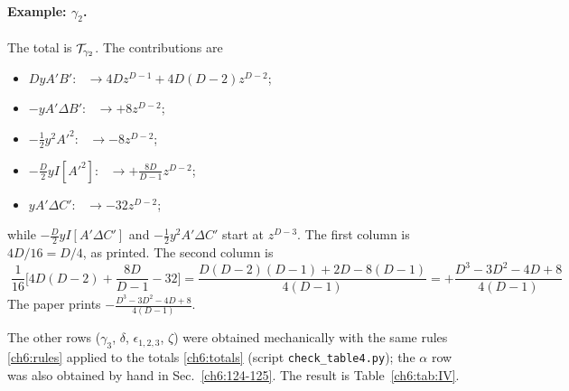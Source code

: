 \paragraph{Example: $\gamma_2$.} The total is $\mathcal{T}_{\gamma_2}$. The contributions are
\begin{itemize}[leftmargin=14pt]
\item $DyA'B'$: \ $\to4Dz^{D-1}+4D(D-2)z^{D-2}$;
\item $-yA'\Delta B'$: \ $\to+8z^{D-2}$;
\item $-\frac12y^2A'^2$: \ $\to-8z^{D-2}$;
\item $-\frac D2yI[A'^2]$: \ $\to+\frac{8D}{D-1}z^{D-2}$;
\item $yA'\Delta C'$: \ $\to-32z^{D-2}$;
\end{itemize}
while $-\frac D2yI[A'\Delta C']$ and $-\frac12y^2A'\Delta C'$ start at $z^{D-3}$. The first column is $4D/16=D/4$, as printed. The second column is
\begin{equation}
\boxed{\;\frac1{16}\Big[4D(D-2)+\frac{8D}{D-1}-32\Big]=\frac{D(D-2)(D-1)+2D-8(D-1)}{4(D-1)}=+\frac{D^3-3D^2-4D+8}{4(D-1)}\;}
\label{ch6:gamma2}
\end{equation}
The paper prints $-\frac{D^3-3D^2-4D+8}{4(D-1)}$.

The other rows ($\gamma_3$, $\delta$, $\epsilon_{1,2,3}$, $\zeta$) were obtained mechanically with the same rules \eqref{ch6:rules} applied to the
totals \eqref{ch6:totals} (script \texttt{check\_table4.py}); the $\alpha$ row was also obtained by hand in Sec.~\ref{ch6:124-125}. The result is
Table~\ref{ch6:tab:IV}.


